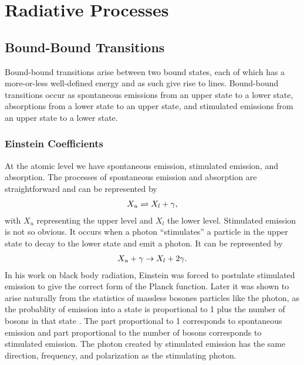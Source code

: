 \newslide

\section{Radiative Processes}

\subsection{Bound-Bound Transitions}

Bound-bound transitions arise between two bound states, each
of which has a more-or-less well-defined energy and as such
give rise to lines. Bound-bound transitions occur as
spontaneous emissions from an upper state to a lower state,
absorptions from a lower state to an upper state, and
stimulated emissions from an upper state to a lower state.

\subsubsection{Einstein Coefficients}

At the atomic level we have spontaneous emission, stimulated
emission, and absorption. The processes of spontaneous
emission and absorption are straightforward and can be
represented by
\begin{align}
X_u \rightleftharpoons X_l + \gamma,
\end{align}
with $X_u$ representing the upper level and $X_l$ the lower
level. Stimulated emission is not so obvious. It occurs when
a photon ``stimulates'' a particle in the upper state to
decay to the lower state and emit a photon. It can be
represented by
\begin{align}
X_u + \gamma \rightarrow X_l + 2\gamma.
\end{align}
In his work on black body radiation, Einstein was forced to
postulate stimulated emission to give the correct form of
the Planck function. Later it was shown to arise naturally
from the statistics of massless bosones particles like the
photon, as the probablity of emission into a state is
proportional to 1 plus the number of bosons in that state
\cite[sections 61 and 62]{Dirac-1958}. The part proportional to
1 corresponds to spontaneous emission and part proportional
to the number of bosons corresponds to stimulated emission.
The photon created by stimulated emission has the same
direction, frequency, and polarization as the stimulating
photon.

